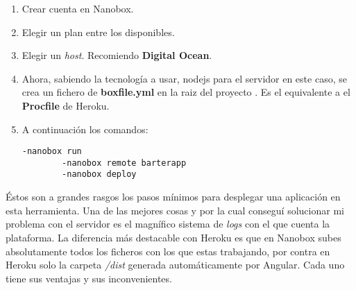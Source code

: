 \begin{enumerate}
	\item Crear cuenta en Nanobox.
	\item Elegir un plan entre los disponibles.
	\item Elegir un \emph{host}. Recomiendo \textbf{Digital Ocean}.
	\item Ahora, sabiendo la tecnología a usar, nodejs para el servidor en este caso, se crea un fichero de  \textbf{boxfile.yml} en la raiz del proyecto\citep{nano2} . Es el equivalente a el \textbf{Procfile} de Heroku.
	\item A continuación los comandos:	

	\lstset{language=C, breaklines=true, basicstyle=\footnotesize}
		\begin{lstlisting}[frame=single] 
		-nanobox run
		-nanobox remote barterapp
		-nanobox deploy
    	\end{lstlisting}	
    	
\end{enumerate}    
	
    	Éstos son a grandes rasgos los pasos mínimos para desplegar una aplicación en esta herramienta. Una de las mejores cosas y por la cual conseguí solucionar mi problema con el servidor es el magnífico sistema de \emph{logs} con el que cuenta la plataforma. La diferencia más destacable con Heroku es que en Nanobox subes absolutamente todos los ficheros con los que estas trabajando, por contra en Heroku solo la carpeta \emph{/dist} generada automáticamente por Angular. Cada uno tiene sus ventajas y sus inconvenientes.
    	









